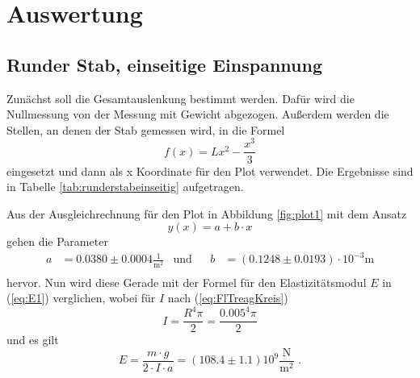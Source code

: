 \section{Auswertung}
\label{sec:Auswertung}

\subsection{Runder Stab, einseitige Einspannung}
Zunächst soll die Gesamtauslenkung bestimmt werden.
Dafür wird die Nullmessung von der Messung mit Gewicht abgezogen.
Außerdem werden die Stellen, an denen der Stab gemessen wird, in die Formel 
\begin{equation}
  f(x) = Lx^2 - \frac{x^3}{3}
\end{equation}
eingesetzt und dann als x Koordinate für den Plot verwendet.
Die Ergebnisse sind in Tabelle \ref{tab:runderstabeinseitig} aufgetragen.

Aus der Ausgleichrechnung für den Plot in Abbildung \ref{fig:plot1} mit dem Ansatz
\begin{equation*}
  y(x) = a + b \cdot x
\end{equation*}
gehen die Parameter
\begin{align*}
  a &= 0.0380 ± 0.0004 \frac{1}{\unit{\meter\squared}} & \text{und}& & b&= (0.1248 ± 0.0193) \cdot 10^{-3} \unit\meter\\
\end{align*}
hervor. Nun wird diese Gerade mit der Formel für den Elastizitätsmodul $E$ in (\ref{eq:E1}) verglichen, wobei für $I$ nach (\ref{eq:FlTreagKreis})
\begin{equation*}
  I = \frac{R^4 \pi}{2} = \frac{0.005^4 \pi}{2}
\end{equation*}
und es gilt
\begin{equation*}
  E = \frac{m \cdot g} {2 \cdot I \cdot a} = (108.4 \pm 1.1) 10^9 \frac{\unit\newton}{\unit\meter^2} \text{ .}
\end{equation*}



